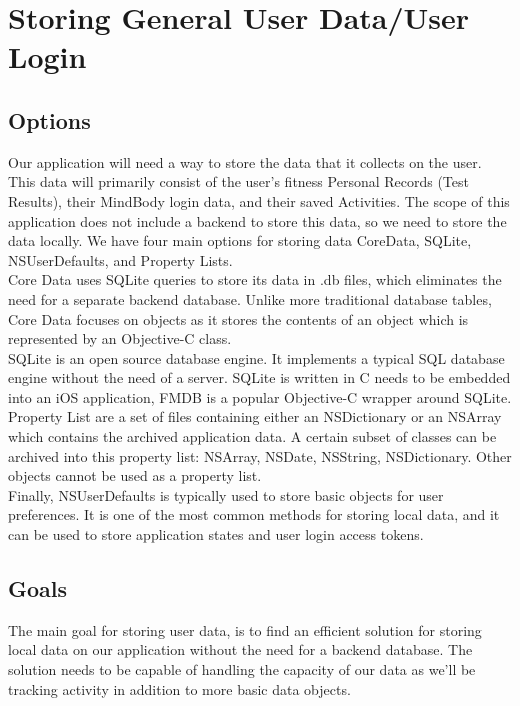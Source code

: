 \documentclass[letterpaper,10pt,titlepage]{article}
\begin{document}
\section{Storing General User Data/User Login}

\subsection{Options}

Our application will need a way to store the data that it collects on the user. This data will primarily consist of the user's fitness Personal Records (Test Results), their MindBody login data, and their saved Activities. The scope of this application does not include a backend to store this data, so we need to store the data locally. We have four main options for storing data CoreData, SQLite, NSUserDefaults, and Property Lists.\\

Core Data uses SQLite queries to store its data in .db files, which eliminates the need for a separate backend database. Unlike more traditional database tables, Core Data focuses on objects as it stores the contents of an object which is represented by an Objective-C class.\\

SQLite is an open source database engine. It implements a typical SQL database engine without the need of a server. SQLite is written in C needs to be embedded into an iOS application, FMDB is a popular Objective-C wrapper around SQLite.\cite{dbpara1}\\

Property List are a set of files containing either an NSDictionary or an NSArray which contains the archived application data. A certain subset of classes can be archived into this property list: NSArray, NSDate, NSString, NSDictionary. Other objects cannot be used as a property list.\\

Finally, NSUserDefaults is typically used to store basic objects for user preferences. It is one of the most common methods for storing local data, and it can be used to store application states and user login access tokens.\cite{dbpara2}\\

\subsection{Goals}

The main goal for storing user data, is to find an efficient solution for storing local data on our application without the need for a backend database. The solution needs to be capable of handling the capacity of our data as we'll be tracking activity in addition to more basic data objects.\\
\end{document}
